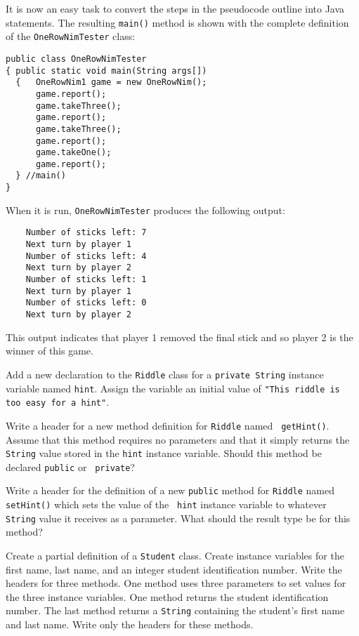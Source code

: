\noindent It is now an easy task to convert the steps in the pseudocode
outline into Java statements.  The resulting {\tt main()} method is shown
with the complete definition of the {\tt OneRowNimTester} class:

\begin{jjjlisting}
\begin{lstlisting}
public class OneRowNimTester 
{ public static void main(String args[])
  {   OneRowNim1 game = new OneRowNim();
      game.report();
      game.takeThree();
      game.report();
      game.takeThree();
      game.report();
      game.takeOne();
      game.report();
  } //main()
}
\end{lstlisting}
\end{jjjlisting}

\noindent When it is run, {\tt OneRowNimTester} produces the following output:

\begin{jjjlisting}
\begin{lstlisting}
    Number of sticks left: 7
    Next turn by player 1
    Number of sticks left: 4
    Next turn by player 2
    Number of sticks left: 1
    Next turn by player 1
    Number of sticks left: 0
    Next turn by player 2
\end{lstlisting}
\end{jjjlisting}

\noindent This output indicates that player 1 removed the final stick
and so player 2 is the winner of this game.


\begin{SSTUDY}
\addtocounter{EXRcount}{2}\item
Add a new declaration to the {\tt Riddle} class for a {\tt private String}
instance variable named {\tt hint}. Assign the variable an initial value
of {\tt "This riddle is too easy for a hint"}.


\item
Write a header for a new method definition for {\tt Riddle} named {\tt
getHint()}. Assume that this method requires no parameters and that it
simply returns the {\tt String} value stored in the {\tt hint}
instance variable. Should this method be declared {\tt public} or {\tt
private}?


\item
Write a header for the definition of a new {\tt public} method for
{\tt Riddle} named {\tt setHint()} which sets the value of the {\tt
hint} instance variable to whatever {\tt String} value it receives as
a parameter.  What should the result type be for this method?

\item
Create a partial definition of a {\tt Student} class.  Create instance
variables for the first name, last name, and an integer student
identification number.  Write the headers for three methods.  One
method uses three parameters to set values for the three instance
variables. One method returns the student identification number.  The
last method returns a {\tt String} containing the student's first name
and last name.  Write only the headers for these methods.

\end{SSTUDY}



